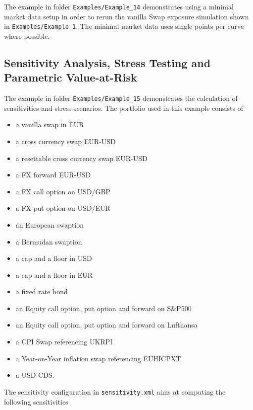\documentclass[12pt, a4paper]{article}
\begin{document}
The example in folder {\tt Examples/Example\_14} demonstrates using a minimal market data setup in order to rerun the vanilla Swap exposure simulation shown in {\tt Examples/Example\_1}. The minimal market data uses single points per curve where possible.

\subsection{Sensitivity Analysis, Stress Testing and Parametric Value-at-Risk}\label{ex:sensitivity_stress}

The example in folder {\tt Examples/Example\_15} demonstrates the calculation of sensitivities and stress scenarios. The
portfolio used in this example consists of

\begin{itemize}
\item a vanilla swap in EUR
\item a cross currency swap EUR-USD
\item a resettable cross currency swap EUR-USD
\item a FX forward EUR-USD
\item a FX call option on USD/GBP %
\item a FX put option on USD/EUR
\item an European swaption
\item a Bermudan swaption 
\item a cap and a floor in USD
\item a cap and a floor in EUR
\item a fixed rate bond
\item an Equity call option, put option and forward on S\&P500
\item an Equity call option, put option and forward on Lufthansa
\item a CPI Swap referencing UKRPI
\item a Year-on-Year inflation swap referencing EUHICPXT
\item a USD CDS.
\end{itemize}

The sensitivity configuration in {\tt sensitivity.xml} aims at computing the following sensitivities
\end{document}
